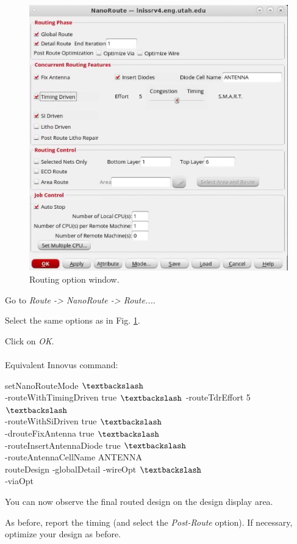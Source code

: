 \begin{enumerate}
	\parbox[t]{\dimexpr\textwidth-\leftmargin}{%
		\begin{figure}
			\vspace{0mm}
			\centering
			\vspace{-\baselineskip}
			\includegraphics[scale=0.3]{figures/lab5_backend/route_options}
			\caption{Routing option window.}
			\label{route_options}
		\end{figure}
		\item Go to \textit{Route -> NanoRoute -> Route...}.
		\item Select the same options as in Fig. \ref{route_options}.
		\item Click on \textit{OK}. \\ \\
		Equivalent Innovus command:
		\begin{codeline}
		setNanoRouteMode $\textbackslash$\\‐routeWithTimingDriven true $\textbackslash$ ‐routeTdrEffort 5 $\textbackslash$\\ -routeWithSiDriven true $\textbackslash$\\ -drouteFixAntenna true $\textbackslash$ \\-routeInsertAntennaDiode true $\textbackslash$ \\-routeAntennaCellName ANTENNA \\
routeDesign ‐globalDetail ‐wireOpt $\textbackslash$\\‐viaOpt
		\end{codeline}
		\item You can now observe the final routed design on the design display area.
	} 
\item As before, report the timing (and select the \textit{Post-Route} option). If necessary, optimize your design as before.


\end{enumerate}
